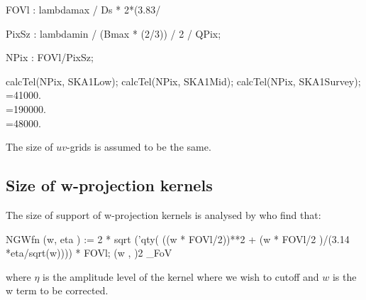 \documentclass[useAMS,usenatbib,referee]{article}
\begin{document}
\begin{maxima}[]
FOVl : lambdamax / Ds * 2*(3.83/ %
\maximaoutput*
{} \\
\end{maxima}

\begin{maxima}[]
PixSz : lambdamin / (Bmax * (2/3)) / 2 / QPix;
\maximaoutput*
{} \\
\end{maxima}

\begin{maxima}[]
NPix : FOVl/PixSz; 

calcTel(NPix, SKA1Low);
calcTel(NPix, SKA1Mid);
calcTel(NPix, SKA1Survey);
\maximaoutput*
{} \\
\m  {}=41000. \\
\m  {}=190000. \\
\m  {}=48000. \\
\end{maxima}

The size of $uv$-grids is assumed to be the same. 

\subsection{Size of w-projection kernels}

The size of support of w-projection kernels is analysed by
\cite{Mitchell2014} who find that:
\begin{maxima}[]
NGWfn (w, eta )  := 2 * sqrt ('qty( ((w * FOVl/2))**2 + (w * FOVl/2 )/(3.14 *eta/sqrt(w))))  * FOVl;
\maximaoutput*
\m  {}\left(w , \eta\right)\mathbin{:=}2\,\,\theta_{\rm FoV} \\
\end{maxima}
where $\eta$ is the amplitude level of the kernel where we wish to
cutoff and $w$ is the w term to be corrected. 
\end{document}
